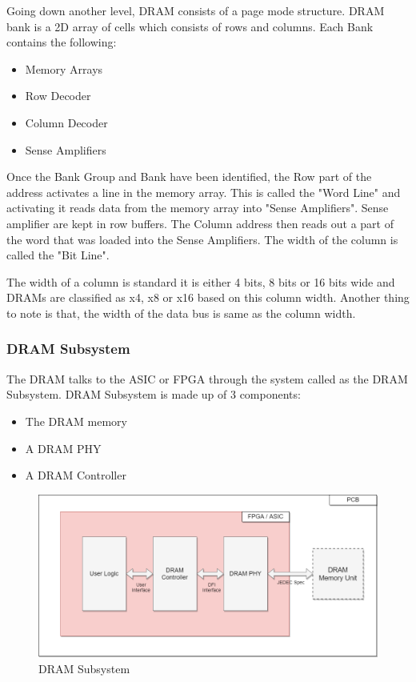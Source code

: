 Going down another level, DRAM consists of a page mode structure. DRAM bank is a 2D array of cells which consists of rows and columns. Each Bank contains the following:

\begin{itemize}
	\item Memory Arrays
	\item Row Decoder
	\item Column Decoder
	\item Sense Amplifiers
\end{itemize} 

Once the Bank Group and Bank have been identified, the Row part of the address activates a line in the memory array. This is called the "Word Line" and activating it reads data from the memory array into "Sense Amplifiers". Sense amplifier are kept in row buffers. The Column address then reads out a part of the word that was loaded into the Sense Amplifiers. The width of the column is called the "Bit Line".

\par The width of a column is standard it is either 4 bits, 8 bits or 16 bits wide and DRAMs are classified as x4, x8 or x16 based on this column width. Another thing to note is that, the width of the data bus is same as the column width.

\clearpage

\subsubsection{DRAM Subsystem}
The DRAM talks to the ASIC or FPGA through the system called as the DRAM Subsystem. DRAM Subsystem is made up of 3 components:

\begin{itemize}
	\item The DRAM memory
	\item A DRAM PHY
	\item A DRAM Controller	
\end{itemize} 

\begin{figure}[H]
	\begin{center}
        \includegraphics[width=\textwidth]{images/DRAMSubsystem.png}
		\caption{DRAM Subsystem}
		\label{DRAMSubsystem}
	\end{center}
\end{figure}


